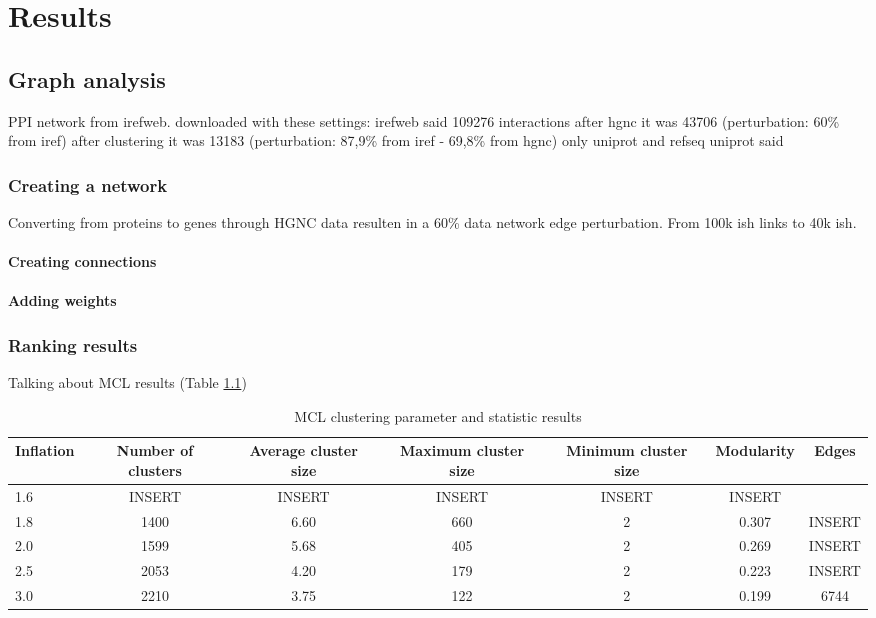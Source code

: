 \part{Results}
\label{pa:results}
\chapter{Graph analysis}
PPI network from irefweb.
downloaded with these settings: %
irefweb said 109276 interactions 
after hgnc it was 43706 (perturbation: 60\% from iref)
after clustering it was 13183 (perturbation: 87,9\% from iref - 69,8\% from hgnc) %
only uniprot and refseq
uniprot said
\section{Creating a network}
Converting from proteins to genes through HGNC data resulten in a 60\% data
network edge perturbation. From 100k ish links to 40k ish.
\subsection{Creating connections}
\subsection{Adding weights}
\section{Ranking results}
Talking about MCL results (Table \ref{tab:mcl-inflation})
\begin{table}
    \centering
    \begin{tabular}{| l | c | c | c | c | c | c |}
        \hline
        \textbf{Inflation} & \textbf{Number of clusters} & \textbf{Average
    cluster size} & \textbf{Maximum cluster size} & \textbf{Minimum cluster
    size} & \textbf{Modularity} & \textbf{Edges}\\
        \hline
        1.6 & INSERT & INSERT & INSERT & INSERT & INSERT \\
        1.8 & 1400 & 6.60 & 660 & 2 & 0.307 & INSERT \\
        2.0 & 1599 & 5.68 & 405 & 2 & 0.269 & INSERT \\
        2.5 & 2053 & 4.20 & 179 & 2 & 0.223 & INSERT \\
        3.0 & 2210 & 3.75 & 122 & 2 & 0.199 & 6744 \\
        \hline
    \end{tabular}
    \caption{MCL clustering parameter and statistic results}
    \label{tab:mcl-inflation}
\end{table}
